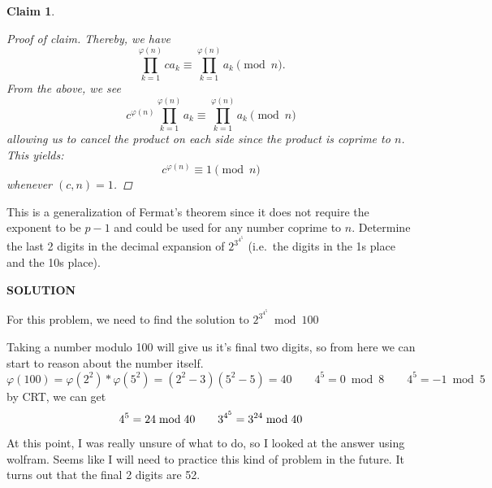 \documentclass{exam} %
\theoremstyle{plain}
\newtheorem{claim}[thm]{Claim}      \newtheorem*{claim*}{Claim}
\theoremstyle{definition}
\theoremstyle{remark}
\newenvironment{claimproof} {
  \begin{proof}[Proof of claim]
  \renewcommand{\qedsymbol}{\ensuremath{\bullet}}
  } {
  \end{proof}
  }
\newcommand{\ds}[1]{ \displaystyle{#1} }
\numberwithin{equation}{section}  %
\renewcommand{\phi}{\varphi}
\newcommand{\sol}{\begin{center}\textbf{SOLUTION}\end{center}}
\begin{document}
\begin{questions}
\begin{claim}
\begin{claimproof}
      Thereby, we have 
      \[
        \prod_{k=1}^{\varphi(n)} ca_k 
        \equiv \prod_{k=1}^{\varphi(n)} a_k \pmod{n}.
      \]
      From the above, we see 
      \[
        c^{\varphi(n)} \prod_{k=1}^{\varphi(n)} 
        a_k \equiv \prod_{k=1}^{\varphi(n)} a_k \pmod{n} 
      \]
      allowing us to cancel
      the product on each side since the product is coprime to $n$. This yields:
      \[
        c^{\varphi(n)} \equiv 1 \pmod{n} 
      \]
      whenever $(c,n) = 1$.
    \end{claimproof}
  \end{claim}
  This is a generalization of Fermat's theorem since it does not require the 
  exponent to be $p-1$ and could be used for any number coprime to $n$.
\question Determine the last 2 digits in the decimal expansion of
$\ds{2^{3^{4^5}}}$ (i.e.\ the digits in the 1s place and the 10s place).
  \sol
  For this problem, we need to find the solution to $\ds{2^{3^{4^5}}} \bmod 100$
  
  Taking a number modulo 100 will give us it's final two digits, so from here
  we can start to reason about the number itself.\\
  \[
    \phi(100) = \phi(2^2)*\phi(5^2) =(2^2 - 3)(5^2 - 5) = 40 \qquad
    4^5 = 0 \bmod 8 \qquad
    4^5 = -1 \bmod 5
  \]
  by CRT, we can get
  \[
    4^5 = 24 \bmod 40 \qquad
    \ds{3^{4^5}} = \ds{3^{24}}\bmod 40\\ 
  \]

  At this point, I was really unsure of what to do, so I looked at the answer 
  using wolfram. Seems like I will need to practice this kind of problem in
  the future. It turns out that the final 2 digits are 52.
\end{questions} 
\end{document}
